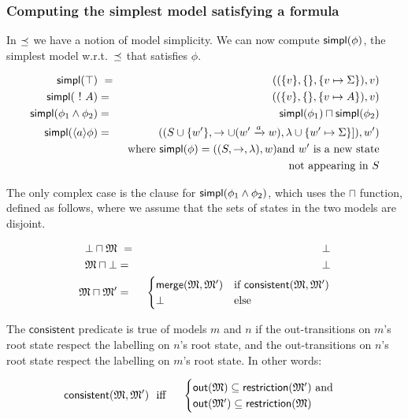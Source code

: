 \subsubsection{Computing the simplest model satisfying a formula}

\NI In $\preceq $ we have a notion of model simplicity.  We can now
compute $\mathsf{simpl}(\phi)$, the simplest model w.r.t.~$\preceq $ that
satisfies $\phi$.

\begin{eqnarray*}
  \mathsf{simpl}(\top) &\ = \ & ( (\{v\}, \{\}, \{v \mapsto \Sigma\}), v)  \\
  \mathsf{simpl}(\ ! \  A) & = & ( (\{v\}, \{\}, \{v \mapsto A\}), v)  \\
  \mathsf{simpl}(\phi_1 \land \phi_2) & = & \mathsf{simpl}(\phi_1) \sqcap \mathsf{simpl}(\phi_2)  \\
  \mathsf{simpl}(\langle a \rangle \phi) 
     & = & ( (S \cup \{w'\}, \rightarrow \cup (w' \xrightarrow{a} w), \lambda \cup \{w' \mapsto \Sigma\}]), w')  \\
		& & \mbox{where }\mathsf{simpl}(\phi) = ( (S, \rightarrow, \lambda), w) \mbox{and } w' \mbox{ is a new state} \\
                &&  \mbox{not appearing in }S 
\end{eqnarray*}

\NI The only complex case is the clause for $\mathsf{simpl}(\phi_1 \land \phi_2)$,
which uses the $\sqcap$ function, defined as follows, where we assume
that the sets of states in the two models are disjoint.

\begin{eqnarray*}
  \bot \sqcap \MMM  &\ =\ &  \bot  \\
  \MMM \sqcap \bot      & = &  \bot  
     \\
  \MMM \sqcap \MMM'
     & = & 
  \begin{cases}
    \mathsf{merge}(\MMM, \MMM') & \text{if}\ \mathsf{consistent}(\MMM, \MMM') \\
    \bot & \text{else}
  \end{cases}
\end{eqnarray*}

\NI The $\mathsf{consistent}$ predicate is true of models $m$ and $n$ if
the out-transitions on $m$'s root state respect the labelling on $n$'s
root state, and the out-transitions on $n$'s root state respect the
labelling on $m$'s root state. In other words:

\begin{eqnarray*}
  \mathsf{consistent}(\frak{M}, \frak{M}') 
     &\ \mbox{ iff }\ & 
  \begin{cases}
    \mathsf{out}(\frak{M}) \subseteq \mathsf{restriction}(\frak{M}') \mbox{ and}  \\
    \mathsf{out}(\frak{M}') \subseteq \mathsf{restriction}(\frak{M}) 
  \end{cases}
\end{eqnarray*}

